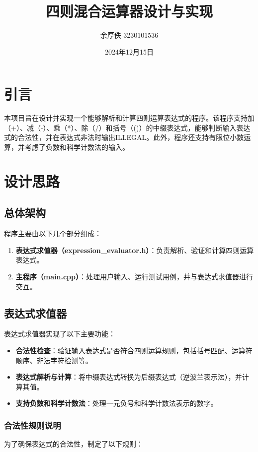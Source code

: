 \documentclass{article}
\title{四则混合运算器设计与实现}
\author{余厚佚 3230101536}
\date{2024年12月15日}
\begin{document}
    \maketitle

    \section{引言}
    本项目旨在设计并实现一个能够解析和计算四则运算表达式的程序。该程序支持加（+）、减（-）、乘（*）、除（/）和括号（()）的中缀表达式，能够判断输入表达式的合法性，并在表达式非法时输出ILLEGAL。此外，程序还支持有限位小数运算，并考虑了负数和科学计数法的输入。

    \section{设计思路}
    \subsection{总体架构}
    程序主要由以下几个部分组成：
    \begin{enumerate}
        \item \textbf{表达式求值器（expression\_evaluator.h）}：负责解析、验证和计算四则运算表达式。
        \item \textbf{主程序（main.cpp）}：处理用户输入、运行测试用例，并与表达式求值器进行交互。
    \end{enumerate}


    \subsection{表达式求值器}
    表达式求值器实现了以下主要功能：
    \begin{itemize}
        \item \textbf{合法性检查}：验证输入表达式是否符合四则运算规则，包括括号匹配、运算符顺序、非法字符检测等。
        \item \textbf{表达式解析与计算}：将中缀表达式转换为后缀表达式（逆波兰表示法），并计算其值。
        \item \textbf{支持负数和科学计数法}：处理一元负号和科学计数法表示的数字。
    \end{itemize}


\subsubsection{合法性规则说明}
为了确保表达式的合法性，制定了以下规则：
\end{document}
